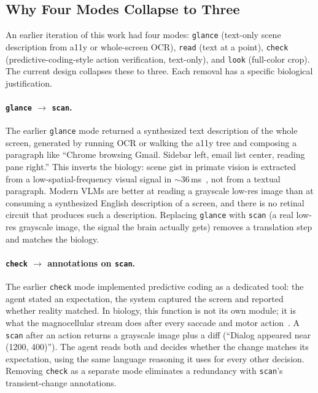 \documentclass[11pt,a4paper]{article}
\begin{document}
\subsection{Why Four Modes Collapse to Three}
\label{sec:four-to-three}

An earlier iteration of this work had four modes: \texttt{glance} (text-only
scene description from a11y or whole-screen OCR), \texttt{read} (text at a
point), \texttt{check} (predictive-coding-style action verification,
text-only), and \texttt{look} (full-color crop). The current design
collapses these to three. Each removal has a specific biological justification.

\paragraph{\texttt{glance} $\to$ \texttt{scan}.}
The earlier \texttt{glance} mode returned a synthesized text description of
the whole screen, generated by running OCR or walking the a11y tree and
composing a paragraph like ``Chrome browsing Gmail. Sidebar left, email list
center, reading pane right.'' This inverts the biology: scene gist in primate
vision is extracted from a low-spatial-frequency visual
signal in $\sim$36\,ms~\cite{greene2009recognition,thorpe1996speed}, not from a
textual paragraph. Modern VLMs are better at reading a grayscale low-res
image than at consuming a synthesized English description of a screen, and
there is no retinal circuit that produces such a description. Replacing
\texttt{glance} with \texttt{scan} (a real low-res grayscale image, the
signal the brain actually gets) removes a translation step and matches the
biology.

\paragraph{\texttt{check} $\to$ annotations on \texttt{scan}.}
The earlier \texttt{check} mode implemented predictive coding as a dedicated
tool: the agent stated an expectation, the system captured the screen and
reported whether reality matched. In biology, this function is not its own
module; it is what the magnocellular stream does after every saccade and
motor action~\cite{friston2005theory,keller2018predictive}. A
\texttt{scan} after an action returns a grayscale image plus a diff (``Dialog
appeared near (1200, 400)''). The agent reads both and decides whether the
change matches its expectation, using the same language reasoning it uses for
every other decision. Removing \texttt{check} as a separate mode eliminates
a redundancy with \texttt{scan}'s transient-change annotations.
\end{document}
